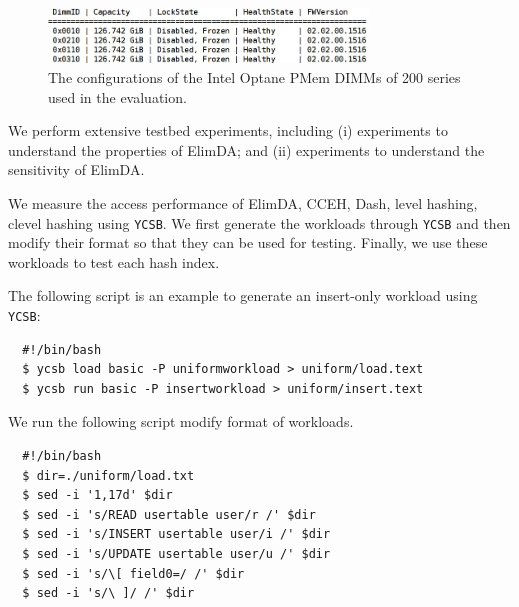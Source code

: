 \documentclass[sigconf, nonacm]{acmart}
\newcommand\sysname{\textsf{ElimDA}\xspace}
\renewcommand{\paragraph}[1]{\smallskip\noindent {\bf #1}}
\begin{document}
\begin{figure}[t]
\centering
\hspace{-0.1in}
\includegraphics[width=8.5cm]{figures/PMem.jpg}
\caption{The configurations of the Intel Optane PMem DIMMs of 200 series used in
the evaluation.}
\label{fig:pmem}
\end{figure}

We perform extensive testbed experiments, including (i) experiments to understand
the properties of \sysname; and (ii) experiments to understand the sensitivity of \sysname.

\paragraph{Experiments with YCSB:} 
We measure the access performance of \sysname, CCEH, Dash, level hashing, clevel hashing using {\tt YCSB}. 
We first generate the workloads through {\tt YCSB} and then modify their format so that they can be used for testing. 
Finally, we use these workloads to test each hash index. 

The following script is an example to generate an insert-only workload using {\tt YCSB}:
\begin{verbatim}
  #!/bin/bash
  $ ycsb load basic -P uniformworkload > uniform/load.text
  $ ycsb run basic -P insertworkload > uniform/insert.text
\end{verbatim}

We run the following script modify format of workloads.
\begin{verbatim}
  #!/bin/bash
  $ dir=./uniform/load.txt
  $ sed -i '1,17d' $dir
  $ sed -i 's/READ usertable user/r /' $dir 
  $ sed -i 's/INSERT usertable user/i /' $dir
  $ sed -i 's/UPDATE usertable user/u /' $dir
  $ sed -i 's/\[ field0=/ /' $dir
  $ sed -i 's/\ ]/ /' $dir
\end{verbatim} 
\end{document}
